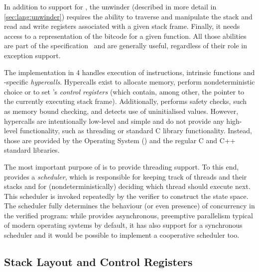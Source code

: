 In addition to support for \llvm{}, the unwinder (described in more detail
in \autoref{sec:lang:unwinder}) requires the ability to traverse and
manipulate the stack and read and write \llvm{} registers associated with a
given stack frame. Finally, it needs access to a representation of the
bitcode for a given function. All those abilities are part of the \divm{}
specification~ and are generally useful, regardless
of their role in exception support.

The \divm{} implementation in \divine{} 4 handles execution of \llvm{}
instructions, \llvm{} intrinsic functions and \divm{}-specific
\emph{hypercalls}. Hypercalls exist to allocate memory,
perform nondeterministic choice or to set \divm{}'s \emph{control
registers} (which contain, among other, the pointer to the currently
executing stack frame). Additionally, \divm{} performs safety checks, such
as memory bound checking, and detects use of uninitialised values.
However, \divm{} hypercalls are intentionally low-level and simple and do
not provide any high-level functionality, such as threading or standard
C library functionality. Instead, those are provided by the \divine{}
Operating System (\dios{}) and the regular C and C++ standard libraries.

The most important purpose of \dios{} is to provide threading support. To
this end, \dios{} provides a \emph{scheduler}, which is responsible for
keeping track of threads and their stacks and for (nondeterministically)
deciding which thread should execute next. This scheduler is invoked
repeatedly by the verifier to construct the state space. The scheduler
fully determines the behaviour (or even presence) of concurrency in the
verified program: while \dios{} provides asynchronous, preemptive
parallelism typical of modern operating systems by default, it has also support
for a synchronous scheduler and it would be possible to implement a
cooperative scheduler too.

\subsection{Stack Layout and Control Registers}\label{sec:lang:stack-layout}

